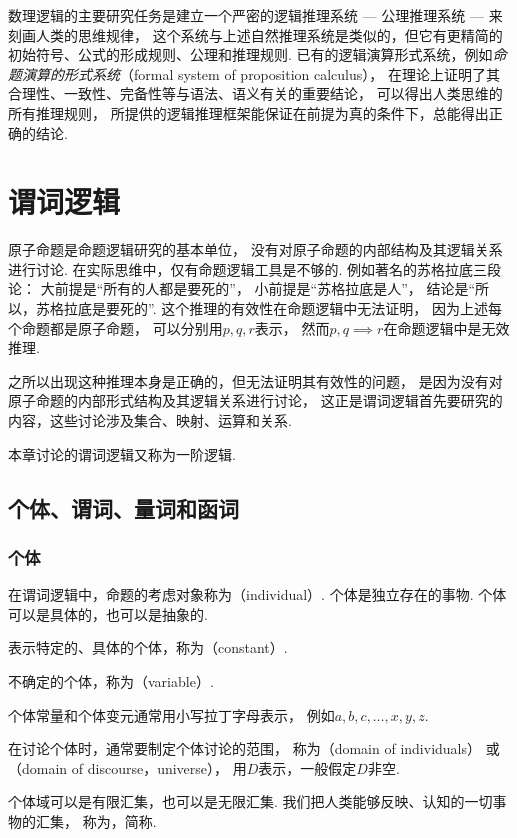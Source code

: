 数理逻辑的主要研究任务是建立一个严密的逻辑推理系统 --- 公理推理系统 --- 来刻画人类的思维规律，
这个系统与上述自然推理系统是类似的，但它有更精简的初始符号、公式的形成规则、公理和推理规则.
已有的逻辑演算形式系统，例如\emph{命题演算的形式系统}（formal system of proposition calculus），
在理论上证明了其合理性、一致性、完备性等与语法、语义有关的重要结论，
可以得出人类思维的所有推理规则，
所提供的逻辑推理框架能保证在前提为真的条件下，总能得出正确的结论.

\chapter{谓词逻辑}
原子命题是命题逻辑研究的基本单位，
没有对原子命题的内部结构及其逻辑关系进行讨论.
在实际思维中，仅有命题逻辑工具是不够的.
例如著名的苏格拉底三段论：
大前提是“所有的人都是要死的”，
小前提是“苏格拉底是人”，
结论是“所以，苏格拉底是要死的”.
这个推理的有效性在命题逻辑中无法证明，
因为上述每个命题都是原子命题，
可以分别用\(p,q,r\)表示，
然而\(p,q \implies r\)在命题逻辑中是无效推理.

之所以出现这种推理本身是正确的，但无法证明其有效性的问题，
是因为没有对原子命题的内部形式结构及其逻辑关系进行讨论，
这正是谓词逻辑首先要研究的内容，这些讨论涉及集合、映射、运算和关系.

本章讨论的谓词逻辑又称为一阶逻辑.

\section{个体、谓词、量词和函词}
\subsection{个体}
在谓词逻辑中，命题的考虑对象称为（individual）.
个体是独立存在的事物.
个体可以是具体的，也可以是抽象的.

表示特定的、具体的个体，称为（constant）.

不确定的个体，称为（variable）.

个体常量和个体变元通常用小写拉丁字母表示，
例如\(a,b,c,\dotsc,x,y,z\).

在讨论个体时，通常要制定个体讨论的范围，
称为（domain of individuals）
或（domain of discourse，universe），
用\(D\)表示，一般假定\(D\)非空.

个体域可以是有限汇集，也可以是无限汇集.
我们把人类能够反映、认知的一切事物的汇集，
称为，简称.


